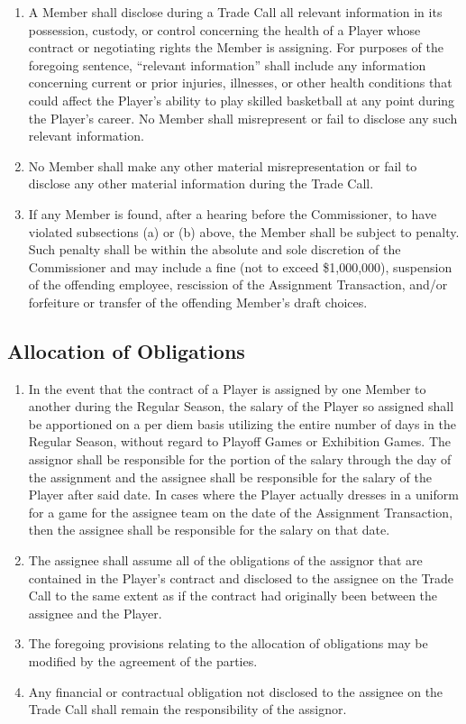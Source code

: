 \documentclass[]{book}
\providecommand{\tightlist}{%
  \setlength{\itemsep}{0pt}\setlength{\parskip}{0pt}}
\begin{document}
\begin{enumerate}
\def\labelenumi{(\alph{enumi})}
\tightlist
\item
  A Member shall disclose during a Trade Call all relevant information in its possession, custody, or control concerning the health of a Player whose contract or negotiating rights the Member is assigning. For purposes of the foregoing sentence, ``relevant information'' shall include any information concerning current or prior injuries, illnesses, or other health conditions that could affect the Player's ability to play skilled basketball at any point during the Player's career. No Member shall misrepresent or fail to disclose any such relevant information.
\item
  No Member shall make any other material misrepresentation or fail to disclose any other material information during the Trade Call.
\item
  If any Member is found, after a hearing before the Commissioner, to have violated subsections (a) or (b) above, the Member shall be subject to penalty. Such penalty shall be within the absolute and sole discretion of the Commissioner and may include a fine (not to exceed \$1,000,000), suspension of the offending employee, rescission of the Assignment Transaction, and/or forfeiture or transfer of the offending Member's draft choices.
\end{enumerate}

\hypertarget{allocation-of-obligations}{%
\subsection{Allocation of Obligations}\label{allocation-of-obligations}}

\begin{enumerate}
\def\labelenumi{(\alph{enumi})}
\tightlist
\item
  In the event that the contract of a Player is assigned by one Member to another during the Regular Season, the salary of the Player so assigned shall be apportioned on a per diem basis utilizing the entire number of days in the Regular Season, without regard to Playoff Games or Exhibition Games. The assignor shall be responsible for the portion of the salary through the day of the assignment and the assignee shall be responsible for the salary of the Player after said date. In cases where the Player actually dresses in a uniform for a game for the assignee team on the date of the Assignment Transaction, then the assignee shall be responsible for the salary on that date.
\item
  The assignee shall assume all of the obligations of the assignor that are contained in the Player's contract and disclosed to the assignee on the Trade Call to the same extent as if the contract had originally been between the assignee and the Player.
\item
  The foregoing provisions relating to the allocation of obligations may be modified by the agreement of the parties.
\item
  Any financial or contractual obligation not disclosed to the assignee on the Trade Call shall remain the responsibility of the assignor.
\end{enumerate}
\end{document}
